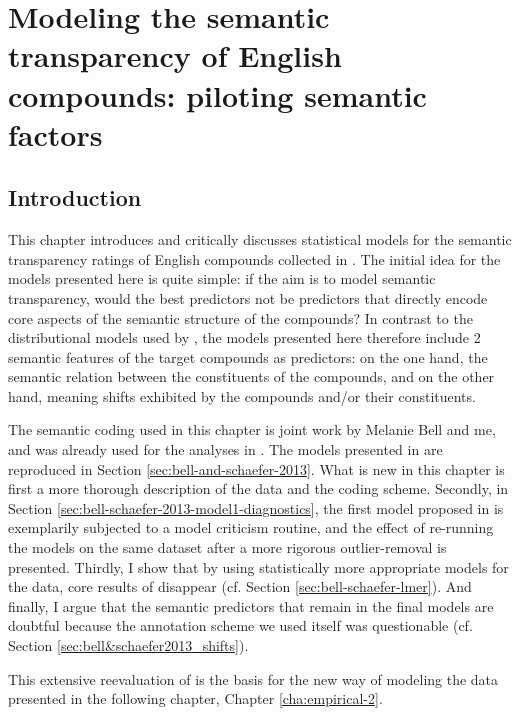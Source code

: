 \chapter[Piloting semantic factors]{Modeling the semantic transparency of  English compounds: piloting semantic factors}
\label{cha:empirical-1}
\section{Introduction}
\label{sec:intro:piloting-semantic-factors}

This chapter introduces and critically discusses statistical models for the
semantic transparency ratings of English
compounds collected in \citet{Reddyetal:2011}. The initial idea for
the models presented here is quite simple: if the aim is to model
semantic transparency, would the best predictors not be predictors
that directly encode core aspects of the semantic structure of the compounds?  In contrast to the
distributional models used by \citet{Reddyetal:2011}, the models
presented here therefore include 2 semantic
features of the target compounds as predictors: on the one hand, the semantic relation between the constituents of the
compounds, and on the other hand, meaning shifts exhibited by the compounds and/or
their constituents.

The semantic coding used in this chapter is joint work by Melanie
Bell and me, and was already used for the analyses in \citet{BellandSchaefer:2013}. The
models presented in \citet{BellandSchaefer:2013} are reproduced in
Section \ref{sec:bell-and-schaefer-2013}. What is new in this chapter is first
a more thorough description of the data and the coding scheme. Secondly, in Section \ref{sec:bell-schaefer-2013-model1-diagnostics}, the first model proposed in \citet{BellandSchaefer:2013} is exemplarily
subjected to a model criticism routine, and the effect of re-running
the models on the same dataset after a more rigorous outlier-removal is presented. 
Thirdly, I show that by using statistically more
appropriate models for the data, core results of
\citet{BellandSchaefer:2013} disappear (cf. Section \ref{sec:bell-schaefer-lmer}). And finally, I argue that
the semantic predictors that remain in the final models are doubtful
because the annotation scheme we used itself was questionable
(cf. Section \ref{sec:bell&schaefer2013_shifts}). 

This extensive
reevaluation of \citet{BellandSchaefer:2013} is the basis for the new
way of modeling the data presented in the following chapter, Chapter \ref{cha:empirical-2}.
 

